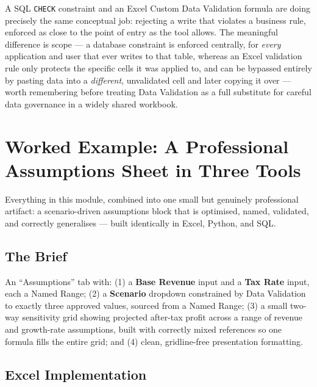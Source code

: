 \documentclass[11pt,a4paper]{article}
\begin{document}
\begin{keyconcept}
A SQL \texttt{CHECK} constraint and an Excel Custom Data Validation formula are doing precisely the same conceptual job: rejecting a write that violates a business rule, enforced as close to the point of entry as the tool allows. The meaningful difference is scope --- a database constraint is enforced centrally, for \emph{every} application and user that ever writes to that table, whereas an Excel validation rule only protects the specific cells it was applied to, and can be bypassed entirely by pasting data into a \emph{different}, unvalidated cell and later copying it over --- worth remembering before treating Data Validation as a full substitute for careful data governance in a widely shared workbook.
\end{keyconcept}

\section{Worked Example: A Professional Assumptions Sheet in Three Tools}

Everything in this module, combined into one small but genuinely professional artifact: a scenario-driven assumptions block that is optimised, named, validated, and correctly generalises --- built identically in Excel, Python, and SQL.

\subsection{The Brief}

An ``Assumptions'' tab with: (1) a \textbf{Base Revenue} input and a \textbf{Tax Rate} input, each a Named Range; (2) a \textbf{Scenario} dropdown constrained by Data Validation to exactly three approved values, sourced from a Named Range; (3) a small two-way sensitivity grid showing projected after-tax profit across a range of revenue and growth-rate assumptions, built with correctly mixed references so one formula fills the entire grid; and (4) clean, gridline-free presentation formatting.

\subsection{Excel Implementation}
\end{document}
